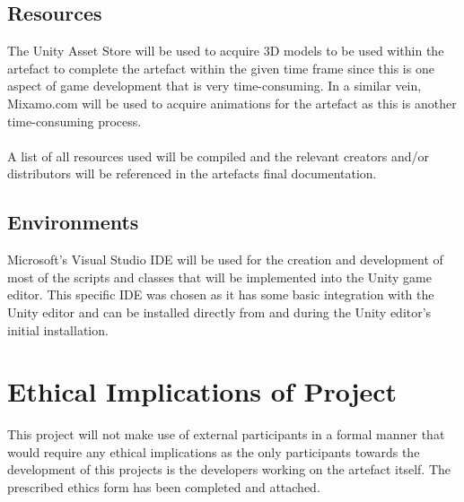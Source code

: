 \subsection{Resources}
The Unity Asset Store will be used to acquire 3D models to be used within the artefact to complete the artefact within the given time frame since this is one aspect of game development that is very time-consuming. In a similar vein, Mixamo.com will be used to acquire animations for the artefact as this is another time-consuming process.
\\\\
A list of all resources used will be compiled and the relevant creators and/or distributors will be referenced in the artefacts final documentation.  

\subsection{Environments}
Microsoft's Visual Studio IDE will be used for the creation and development of most of the scripts and classes that will be implemented into the Unity game editor. This specific IDE was chosen as it has some basic integration with the Unity editor and can be installed directly from and during the Unity editor's initial installation.

\section{Ethical Implications of Project}
This project will not make use of external participants in a formal manner that would require any ethical implications as the only participants towards the development of this projects is the developers working on the artefact itself. The prescribed ethics form has been completed and attached.

